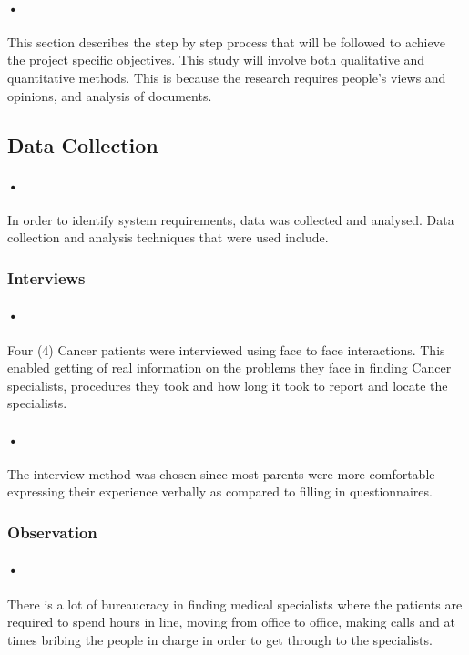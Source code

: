 \documentclass[12pt]{article}
\begin{document}
\paragraph{•}This section describes the step by step process that will be followed to achieve the project specific objectives. This study will involve both qualitative and quantitative methods.
This is because the research requires people’s views and opinions, and analysis of documents.

\subsection{Data Collection}
\paragraph{•}In order to identify system requirements, data was collected and analysed. Data collection and analysis techniques that were used include.

\subsubsection{Interviews} 
\paragraph{•}Four (4) Cancer patients were interviewed using face to face interactions. This enabled getting of real information on the problems they face in finding Cancer specialists, procedures they took and how long it took to report and locate the specialists.
\paragraph{•}The interview method was chosen since most parents were more comfortable expressing their experience verbally as compared to filling in questionnaires. 

\subsubsection{Observation}

\paragraph{•}There is a lot of bureaucracy in finding medical specialists where the patients are required to spend hours in line, moving from office to office, making calls and at times bribing the people in charge in order to get through to the specialists. 
\end{document}
